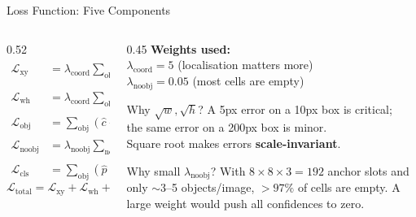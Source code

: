 \documentclass[aspectratio=169, 10pt]{beamer}
\begin{document}
\begin{frame}{Loss Function: Five Components}
\begin{columns}[T]
\begin{column}{0.52\textwidth}
\begin{align*}
  \mathcal{L}_{\text{xy}}    &= \lambda_{\text{coord}}
    \sum_{\text{obj}} (\hat{x}-x)^2 + (\hat{y}-y)^2 \\[4pt]
  \mathcal{L}_{\text{wh}}    &= \lambda_{\text{coord}}
    \sum_{\text{obj}} (\sqrt{\hat{w}}-\sqrt{w})^2
                           + (\sqrt{\hat{h}}-\sqrt{h})^2 \\[4pt]
  \mathcal{L}_{\text{obj}}   &= \sum_{\text{obj}}
    (\hat{c} - 1)^2 \\[4pt]
  \mathcal{L}_{\text{noobj}} &= \lambda_{\text{noobj}}
    \sum_{\text{no obj}} \hat{c}^{\,2} \\[4pt]
  \mathcal{L}_{\text{cls}}   &= \sum_{\text{obj}}
    (\hat{p} - p)^2
\end{align*}
\[
  \mathcal{L}_{\text{total}} = \mathcal{L}_{\text{xy}}
    + \mathcal{L}_{\text{wh}} + \mathcal{L}_{\text{obj}}
    + \mathcal{L}_{\text{noobj}} + \mathcal{L}_{\text{cls}}
\]
\end{column}
\begin{column}{0.45\textwidth}
  \textbf{Weights used:}\\[6pt]
  $\lambda_{\text{coord}} = 5$ \quad (localisation matters more)\\
  $\lambda_{\text{noobj}} = 0.05$ \quad (most cells are empty)

  \vspace{0.2cm}
  \begin{alertblock}{Why $\sqrt{w}, \sqrt{h}$?}
    A 5px error on a 10px box is critical;\\
    the same error on a 200px box is minor.\\
    Square root makes errors \textbf{scale-invariant}.
  \end{alertblock}

  \vspace{0.1cm}
  \begin{alertblock}{Why small $\lambda_{\text{noobj}}$?}
    With $8\times8\times3=192$ anchor slots and
    only $\sim$3–5 objects/image, $>97\%$ of cells
    are empty. A large weight would push all
    confidences to zero.
  \end{alertblock}
\end{column}
\end{columns}
\end{frame}
\end{document}

